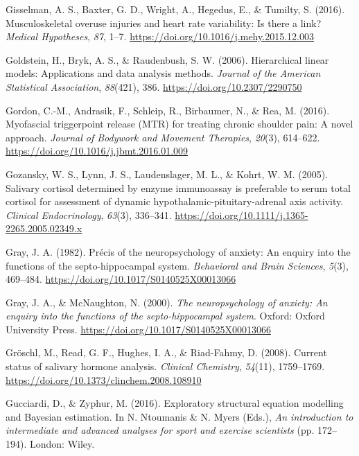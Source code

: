 \documentclass[man,floatsintext]{apa6}
\begin{document}
\leavevmode\hypertarget{ref-Gisselman2016}{}%
Gisselman, A. S., Baxter, G. D., Wright, A., Hegedus, E., \& Tumilty, S. (2016). Musculoskeletal overuse injuries and heart rate variability: Is there a link? \emph{Medical Hypotheses}, \emph{87}, 1--7. \url{https://doi.org/10.1016/j.mehy.2015.12.003}

\leavevmode\hypertarget{ref-Raudenbush2002}{}%
Goldstein, H., Bryk, A. S., \& Raudenbush, S. W. (2006). Hierarchical linear models: Applications and data analysis methods. \emph{Journal of the American Statistical Association}, \emph{88}(421), 386. \url{https://doi.org/10.2307/2290750}

\leavevmode\hypertarget{ref-Gordon2016}{}%
Gordon, C.-M., Andrasik, F., Schleip, R., Birbaumer, N., \& Rea, M. (2016). Myofascial triggerpoint release (MTR) for treating chronic shoulder pain: A novel approach. \emph{Journal of Bodywork and Movement Therapies}, \emph{20}(3), 614--622. \url{https://doi.org/10.1016/j.jbmt.2016.01.009}

\leavevmode\hypertarget{ref-Gozansky2005}{}%
Gozansky, W. S., Lynn, J. S., Laudenslager, M. L., \& Kohrt, W. M. (2005). Salivary cortisol determined by enzyme immunoassay is preferable to serum total cortisol for assessment of dynamic hypothalamic-pituitary-adrenal axis activity. \emph{Clinical Endocrinology}, \emph{63}(3), 336--341. \url{https://doi.org/10.1111/j.1365-2265.2005.02349.x}

\leavevmode\hypertarget{ref-Gray1982a}{}%
Gray, J. A. (1982). Précis of the neuropsychology of anxiety: An enquiry into the functions of the septo-hippocampal system. \emph{Behavioral and Brain Sciences}, \emph{5}(3), 469--484. \url{https://doi.org/10.1017/S0140525X00013066}

\leavevmode\hypertarget{ref-Gray2000}{}%
Gray, J. A., \& McNaughton, N. (2000). \emph{The neuropsychology of anxiety: An enquiry into the functions of the septo-hippocampal system}. Oxford: Oxford University Press. \url{https://doi.org/10.1017/S0140525X00013066}

\leavevmode\hypertarget{ref-Groschl2008}{}%
Gröschl, M., Read, G. F., Hughes, I. A., \& Riad-Fahmy, D. (2008). Current status of salivary hormone analysis. \emph{Clinical Chemistry}, \emph{54}(11), 1759--1769. \url{https://doi.org/10.1373/clinchem.2008.108910}

\leavevmode\hypertarget{ref-Gucci2016}{}%
Gucciardi, D., \& Zyphur, M. (2016). Exploratory structural equation modelling and Bayesian estimation. In N. Ntoumanis \& N. Myers (Eds.), \emph{An introduction to intermediate and advanced analyses for sport and exercise scientists} (pp. 172--194). London: Wiley.
\end{document}
